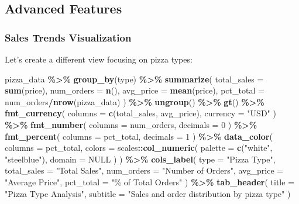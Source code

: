 \documentclass[
]{article}
\newenvironment{Shaded}{\begin{snugshade}}{\end{snugshade}}
\newcommand{\AttributeTok}[1]{\textcolor[rgb]{0.13,0.29,0.53}{#1}}
\newcommand{\ConstantTok}[1]{\textcolor[rgb]{0.56,0.35,0.01}{#1}}
\newcommand{\DecValTok}[1]{\textcolor[rgb]{0.00,0.00,0.81}{#1}}
\newcommand{\FunctionTok}[1]{\textcolor[rgb]{0.13,0.29,0.53}{\textbf{#1}}}
\newcommand{\NormalTok}[1]{#1}
\newcommand{\SpecialCharTok}[1]{\textcolor[rgb]{0.81,0.36,0.00}{\textbf{#1}}}
\newcommand{\StringTok}[1]{\textcolor[rgb]{0.31,0.60,0.02}{#1}}
\begin{document}
\subsection{Advanced Features}\label{advanced-features}

\subsubsection{Sales Trends
Visualization}\label{sales-trends-visualization}

Let's create a different view focusing on pizza types:

\begin{Shaded}
\begin{Highlighting}[]
\NormalTok{pizza\_data }\SpecialCharTok{\%\textgreater{}\%}
  \FunctionTok{group\_by}\NormalTok{(type) }\SpecialCharTok{\%\textgreater{}\%}
  \FunctionTok{summarize}\NormalTok{(}
    \AttributeTok{total\_sales =} \FunctionTok{sum}\NormalTok{(price),}
    \AttributeTok{num\_orders =} \FunctionTok{n}\NormalTok{(),}
    \AttributeTok{avg\_price =} \FunctionTok{mean}\NormalTok{(price),}
    \AttributeTok{pct\_total =}\NormalTok{ num\_orders}\SpecialCharTok{/}\FunctionTok{nrow}\NormalTok{(pizza\_data)}
\NormalTok{  ) }\SpecialCharTok{\%\textgreater{}\%}
  \FunctionTok{ungroup}\NormalTok{() }\SpecialCharTok{\%\textgreater{}\%}
  \FunctionTok{gt}\NormalTok{() }\SpecialCharTok{\%\textgreater{}\%}
  \FunctionTok{fmt\_currency}\NormalTok{(}
    \AttributeTok{columns =} \FunctionTok{c}\NormalTok{(total\_sales, avg\_price),}
    \AttributeTok{currency =} \StringTok{"USD"}
\NormalTok{  ) }\SpecialCharTok{\%\textgreater{}\%}
  \FunctionTok{fmt\_number}\NormalTok{(}
    \AttributeTok{columns =}\NormalTok{ num\_orders,}
    \AttributeTok{decimals =} \DecValTok{0}
\NormalTok{  ) }\SpecialCharTok{\%\textgreater{}\%}
  \FunctionTok{fmt\_percent}\NormalTok{(}
    \AttributeTok{columns =}\NormalTok{ pct\_total,}
    \AttributeTok{decimals =} \DecValTok{1}
\NormalTok{  ) }\SpecialCharTok{\%\textgreater{}\%}
  \FunctionTok{data\_color}\NormalTok{(}
    \AttributeTok{columns =}\NormalTok{ pct\_total,}
    \AttributeTok{colors =}\NormalTok{ scales}\SpecialCharTok{::}\FunctionTok{col\_numeric}\NormalTok{(}
      \AttributeTok{palette =} \FunctionTok{c}\NormalTok{(}\StringTok{"white"}\NormalTok{, }\StringTok{"steelblue"}\NormalTok{),}
      \AttributeTok{domain =} \ConstantTok{NULL}
\NormalTok{    )}
\NormalTok{  ) }\SpecialCharTok{\%\textgreater{}\%}
  \FunctionTok{cols\_label}\NormalTok{(}
    \AttributeTok{type =} \StringTok{"Pizza Type"}\NormalTok{,}
    \AttributeTok{total\_sales =} \StringTok{"Total Sales"}\NormalTok{,}
    \AttributeTok{num\_orders =} \StringTok{"Number of Orders"}\NormalTok{,}
    \AttributeTok{avg\_price =} \StringTok{"Average Price"}\NormalTok{,}
    \AttributeTok{pct\_total =} \StringTok{"\% of Total Orders"}
\NormalTok{  ) }\SpecialCharTok{\%\textgreater{}\%}
  \FunctionTok{tab\_header}\NormalTok{(}
    \AttributeTok{title =} \StringTok{"Pizza Type Analysis"}\NormalTok{,}
    \AttributeTok{subtitle =} \StringTok{"Sales and order distribution by pizza type"}
\NormalTok{  )}
\end{Highlighting}
\end{Shaded}
\end{document}
